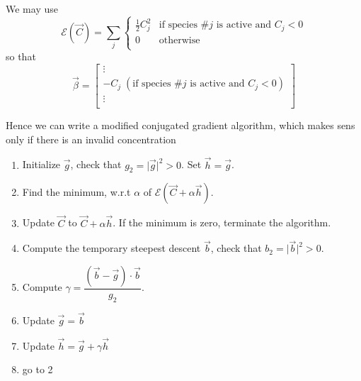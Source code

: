 \documentclass[aps]{revtex4}
\begin{document}
We may use
\begin{equation}
\mathcal{E}\left(\vec{C}\right) = \sum_{j} 
\left\lbrace
\begin{array}{ll}
\frac{1}{2} C_j^2 & \text{if species $\#j$ is  active  and $C_j<0$}  \\
0 & \text{otherwise}\\
\end{array}
\right. 
\end{equation}
so that
\begin{equation}
	\vec{\beta} =
	\begin{bmatrix}
	\vdots\\
	-C_j \; (\text{if species $\#j$ is  active  and $C_j<0$})\\
	\vdots\\
	\end{bmatrix}
\end{equation}

Hence we can write a modified conjugated gradient algorithm, which makes sens only if there is
an invalid concentration

\begin{enumerate}
\item Initialize $\vec{g}$, check that $g_2=\vert\vec{g}\vert^2>0$. Set $\vec{h}=\vec{g}$.
\item Find the minimum, w.r.t $\alpha$ of $\mathcal{E}\left(\vec{C}+\alpha \vec{h}\right)$. 
\item Update $\vec{C}$ to $\vec{C}+\alpha\vec{h}$. If the minimum is zero, terminate the algorithm.
\item Compute the temporary steepest descent $\vec{b}$, check that $b_2=\vert\vec{b}\vert^2>0$.
\item Compute $\gamma=\dfrac{\left(\vec{b}-\vec{g}\right)\cdot \vec{b}}{g_2}$.
\item Update $\vec{g} = \vec{b}$
\item Update $\vec{h} = \vec{g} + \gamma \vec{h}$
\item go to 2
\end{enumerate}
\end{document}
